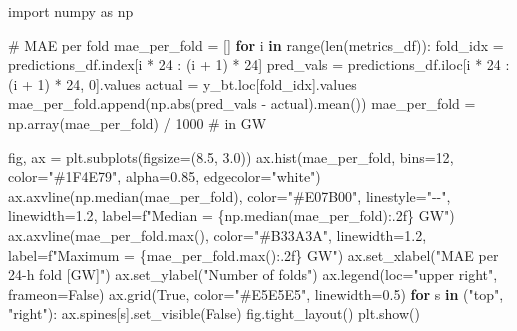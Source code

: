 \documentclass[
  english,
  letterpaper,
]{scrbook}
\newenvironment{Shaded}{\begin{snugshade}}{\end{snugshade}}
\newcommand{\BuiltInTok}[1]{\textcolor[rgb]{0.00,0.23,0.31}{#1}}
\newcommand{\CommentTok}[1]{\textcolor[rgb]{0.37,0.37,0.37}{#1}}
\newcommand{\ControlFlowTok}[1]{\textcolor[rgb]{0.00,0.23,0.31}{\textbf{#1}}}
\newcommand{\DecValTok}[1]{\textcolor[rgb]{0.68,0.00,0.00}{#1}}
\newcommand{\FloatTok}[1]{\textcolor[rgb]{0.68,0.00,0.00}{#1}}
\newcommand{\ImportTok}[1]{\textcolor[rgb]{0.00,0.46,0.62}{#1}}
\newcommand{\KeywordTok}[1]{\textcolor[rgb]{0.00,0.23,0.31}{\textbf{#1}}}
\newcommand{\NormalTok}[1]{\textcolor[rgb]{0.00,0.23,0.31}{#1}}
\newcommand{\OperatorTok}[1]{\textcolor[rgb]{0.37,0.37,0.37}{#1}}
\newcommand{\SpecialCharTok}[1]{\textcolor[rgb]{0.37,0.37,0.37}{#1}}
\newcommand{\SpecialStringTok}[1]{\textcolor[rgb]{0.13,0.47,0.30}{#1}}
\newcommand{\StringTok}[1]{\textcolor[rgb]{0.13,0.47,0.30}{#1}}
\newcommand{\VariableTok}[1]{\textcolor[rgb]{0.07,0.07,0.07}{#1}}
\begin{document}
\begin{Shaded}
\begin{Highlighting}[]
\ImportTok{import}\NormalTok{ numpy }\ImportTok{as}\NormalTok{ np}

\CommentTok{\# MAE per fold}
\NormalTok{mae\_per\_fold }\OperatorTok{=}\NormalTok{ []}
\ControlFlowTok{for}\NormalTok{ i }\KeywordTok{in} \BuiltInTok{range}\NormalTok{(}\BuiltInTok{len}\NormalTok{(metrics\_df)):}
\NormalTok{    fold\_idx }\OperatorTok{=}\NormalTok{ predictions\_df.index[i }\OperatorTok{*} \DecValTok{24}\NormalTok{ : (i }\OperatorTok{+} \DecValTok{1}\NormalTok{) }\OperatorTok{*} \DecValTok{24}\NormalTok{]}
\NormalTok{    pred\_vals }\OperatorTok{=}\NormalTok{ predictions\_df.iloc[i }\OperatorTok{*} \DecValTok{24}\NormalTok{ : (i }\OperatorTok{+} \DecValTok{1}\NormalTok{) }\OperatorTok{*} \DecValTok{24}\NormalTok{, }\DecValTok{0}\NormalTok{].values}
\NormalTok{    actual }\OperatorTok{=}\NormalTok{ y\_bt.loc[fold\_idx].values}
\NormalTok{    mae\_per\_fold.append(np.}\BuiltInTok{abs}\NormalTok{(pred\_vals }\OperatorTok{{-}}\NormalTok{ actual).mean())}
\NormalTok{mae\_per\_fold }\OperatorTok{=}\NormalTok{ np.array(mae\_per\_fold) }\OperatorTok{/} \DecValTok{1000}   \CommentTok{\# in GW}

\NormalTok{fig, ax }\OperatorTok{=}\NormalTok{ plt.subplots(figsize}\OperatorTok{=}\NormalTok{(}\FloatTok{8.5}\NormalTok{, }\FloatTok{3.0}\NormalTok{))}
\NormalTok{ax.hist(mae\_per\_fold, bins}\OperatorTok{=}\DecValTok{12}\NormalTok{, color}\OperatorTok{=}\StringTok{"\#1F4E79"}\NormalTok{, alpha}\OperatorTok{=}\FloatTok{0.85}\NormalTok{, edgecolor}\OperatorTok{=}\StringTok{"white"}\NormalTok{)}
\NormalTok{ax.axvline(np.median(mae\_per\_fold), color}\OperatorTok{=}\StringTok{"\#E07B00"}\NormalTok{, linestyle}\OperatorTok{=}\StringTok{"{-}{-}"}\NormalTok{,}
\NormalTok{           linewidth}\OperatorTok{=}\FloatTok{1.2}\NormalTok{, label}\OperatorTok{=}\SpecialStringTok{f"Median = }\SpecialCharTok{\{}\NormalTok{np}\SpecialCharTok{.}\NormalTok{median(mae\_per\_fold)}\SpecialCharTok{:.2f\}}\SpecialStringTok{ GW"}\NormalTok{)}
\NormalTok{ax.axvline(mae\_per\_fold.}\BuiltInTok{max}\NormalTok{(), color}\OperatorTok{=}\StringTok{"\#B33A3A"}\NormalTok{, linewidth}\OperatorTok{=}\FloatTok{1.2}\NormalTok{,}
\NormalTok{           label}\OperatorTok{=}\SpecialStringTok{f"Maximum = }\SpecialCharTok{\{}\NormalTok{mae\_per\_fold}\SpecialCharTok{.}\BuiltInTok{max}\NormalTok{()}\SpecialCharTok{:.2f\}}\SpecialStringTok{ GW"}\NormalTok{)}
\NormalTok{ax.set\_xlabel(}\StringTok{"MAE per 24{-}h fold [GW]"}\NormalTok{)}
\NormalTok{ax.set\_ylabel(}\StringTok{"Number of folds"}\NormalTok{)}
\NormalTok{ax.legend(loc}\OperatorTok{=}\StringTok{"upper right"}\NormalTok{, frameon}\OperatorTok{=}\VariableTok{False}\NormalTok{)}
\NormalTok{ax.grid(}\VariableTok{True}\NormalTok{, color}\OperatorTok{=}\StringTok{"\#E5E5E5"}\NormalTok{, linewidth}\OperatorTok{=}\FloatTok{0.5}\NormalTok{)}
\ControlFlowTok{for}\NormalTok{ s }\KeywordTok{in}\NormalTok{ (}\StringTok{"top"}\NormalTok{, }\StringTok{"right"}\NormalTok{):}
\NormalTok{    ax.spines[s].set\_visible(}\VariableTok{False}\NormalTok{)}
\NormalTok{fig.tight\_layout()}
\NormalTok{plt.show()}
\end{Highlighting}
\end{Shaded}
\end{document}

